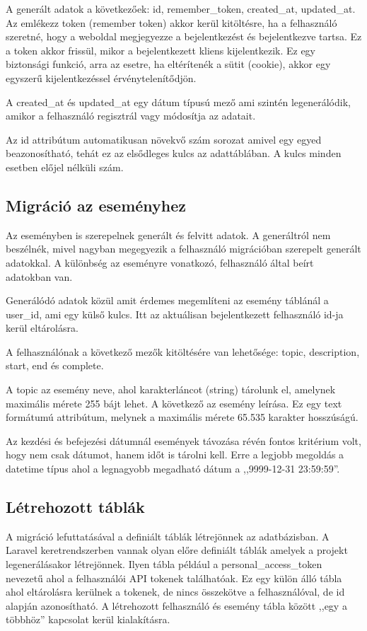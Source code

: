\documentclass[
]{thesis-ekf}
\theoremstyle{definition}
\theoremstyle{remark}
\begin{document}
	A generált adatok a következőek: id, remember\_token, created\_at, updated\_at. Az emlékezz token (remember token) akkor kerül kitöltésre, ha a felhasználó szeretné, hogy a weboldal megjegyezze a bejelentkezést és bejelentkezve tartsa. Ez a token akkor frissül, mikor a bejelentkezett kliens kijelentkezik. Ez egy biztonsági funkció, arra az esetre, ha eltérítenék a sütit (cookie), akkor egy egyszerű kijelentkezéssel érvénytelenítődjön. 
	
	A created\_at és updated\_at egy dátum típusú mező ami szintén legenerálódik, amikor a felhasználó regisztrál vagy módosítja az adatait. 
	
	Az id attribútum automatikusan növekvő szám sorozat amivel egy egyed beazonosítható, tehát ez az elsődleges kulcs az adattáblában.  A kulcs minden esetben előjel nélküli szám.
	
	\subsection{Migráció az eseményhez}
	Az eseményben is szerepelnek generált és felvitt adatok. A generáltról nem beszélnék, mivel nagyban megegyezik a felhasználó migrációban szerepelt generált adatokkal. A különbség az eseményre vonatkozó, felhasználó által beírt adatokban van. 
	
	Generálódó adatok közül amit érdemes megemlíteni az esemény táblánál a user\_id, ami egy külső kulcs. Itt az aktuálisan bejelentkezett felhasználó id-ja kerül eltárolásra. 
	
	A felhasználónak a következő mezők kitöltésére van lehetősége: topic, description, start, end és complete. 
	
	A topic az esemény neve, ahol karakterláncot (string) tárolunk el, amelynek maximális mérete 255 bájt lehet. A következő az esemény leírása. Ez egy text formátumú attribútum, melynek a maximális mérete 65.535 karakter hosszúságú.
	
	Az kezdési és befejezési dátumnál események távozása révén fontos kritérium volt, hogy nem csak dátumot, hanem időt is tárolni kell. Erre a legjobb megoldás a datetime típus ahol a legnagyobb megadható dátum a ,,9999-12-31 23:59:59''.
	
	\subsection{Létrehozott táblák}
	A migráció lefuttatásával a definiált táblák létrejönnek az adatbázisban. A Laravel keretrendszerben vannak olyan előre definiált táblák amelyek a projekt legenerálásakor létrejönnek. Ilyen tábla például a personal\_access\_token nevezetű ahol a felhasználói API tokenek találhatóak. Ez egy külön álló tábla ahol eltárolásra kerülnek a tokenek, de nincs összekötve a felhasználóval, de id alapján azonosítható. A létrehozott felhasználó és esemény tábla között ,,egy a többhöz'' kapcsolat kerül kialakításra.
	
\end{document}
